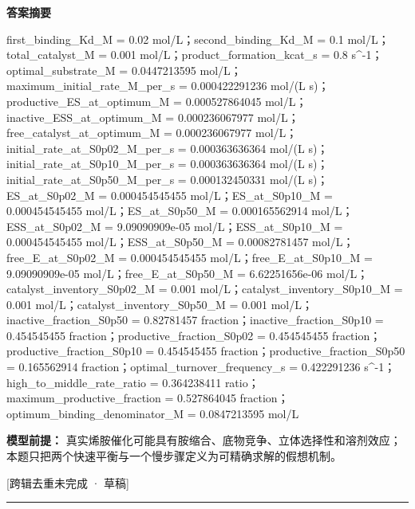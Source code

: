 \documentclass[UTF8,11pt,a4paper]{ctexart}
\begin{document}
\noindent\textbf{答案摘要}\par
first\_binding\_Kd\_M = 0.02 mol/L；second\_binding\_Kd\_M = 0.1 mol/L；total\_catalyst\_M = 0.001 mol/L；product\_formation\_kcat\_s = 0.8 s\textasciicircum{}-1；optimal\_substrate\_M = 0.0447213595 mol/L；maximum\_initial\_rate\_M\_per\_s = 0.000422291236 mol/(L s)；productive\_ES\_at\_optimum\_M = 0.000527864045 mol/L；inactive\_ESS\_at\_optimum\_M = 0.000236067977 mol/L；free\_catalyst\_at\_optimum\_M = 0.000236067977 mol/L；initial\_rate\_at\_S0p02\_M\_per\_s = 0.000363636364 mol/(L s)；initial\_rate\_at\_S0p10\_M\_per\_s = 0.000363636364 mol/(L s)；initial\_rate\_at\_S0p50\_M\_per\_s = 0.000132450331 mol/(L s)；ES\_at\_S0p02\_M = 0.000454545455 mol/L；ES\_at\_S0p10\_M = 0.000454545455 mol/L；ES\_at\_S0p50\_M = 0.000165562914 mol/L；ESS\_at\_S0p02\_M = 9.09090909e-05 mol/L；ESS\_at\_S0p10\_M = 0.000454545455 mol/L；ESS\_at\_S0p50\_M = 0.00082781457 mol/L；free\_E\_at\_S0p02\_M = 0.000454545455 mol/L；free\_E\_at\_S0p10\_M = 9.09090909e-05 mol/L；free\_E\_at\_S0p50\_M = 6.62251656e-06 mol/L；catalyst\_inventory\_S0p02\_M = 0.001 mol/L；catalyst\_inventory\_S0p10\_M = 0.001 mol/L；catalyst\_inventory\_S0p50\_M = 0.001 mol/L；inactive\_fraction\_S0p50 = 0.82781457 fraction；inactive\_fraction\_S0p10 = 0.454545455 fraction；productive\_fraction\_S0p02 = 0.454545455 fraction；productive\_fraction\_S0p10 = 0.454545455 fraction；productive\_fraction\_S0p50 = 0.165562914 fraction；optimal\_turnover\_frequency\_s = 0.422291236 s\textasciicircum{}-1；high\_to\_middle\_rate\_ratio = 0.364238411 ratio；maximum\_productive\_fraction = 0.527864045 fraction；optimum\_binding\_denominator\_M = 0.0847213595 mol/L\par
\noindent\textbf{模型前提：}
真实烯胺催化可能具有胺缩合、底物竞争、立体选择性和溶剂效应；本题只把两个快速平衡与一个慢步骤定义为可精确求解的假想机制。\par
\noindent\textcolor{red!65!black}{[跨辑去重未完成 · 草稿]} \par
\medskip\hrule\medskip
{}
\end{document}
